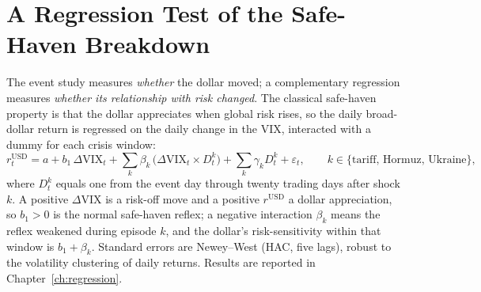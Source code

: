 \section{A Regression Test of the Safe-Haven Breakdown}
\label{sec:method_regression}

The event study measures \emph{whether} the dollar moved; a complementary regression
measures \emph{whether its relationship with risk changed}. The classical safe-haven
property is that the dollar appreciates when global risk rises, so the daily broad-dollar
return is regressed on the daily change in the VIX, interacted with a dummy for each crisis
window:
\begin{equation}
  r^{\text{USD}}_{t} = a + b_1\,\Delta\mathrm{VIX}_t
     + \sum_{k}\beta_k\,\bigl(\Delta\mathrm{VIX}_t \times D^{k}_t\bigr)
     + \sum_{k}\gamma_k D^{k}_t + \varepsilon_t,
  \qquad k\in\{\text{tariff},\,\text{Hormuz},\,\text{Ukraine}\},
\end{equation}
where $D^{k}_t$ equals one from the event day through twenty trading days after shock $k$. A
positive $\Delta\mathrm{VIX}$ is a risk-off move and a positive $r^{\text{USD}}$ a dollar
appreciation, so $b_1>0$ is the normal safe-haven reflex; a negative interaction $\beta_k$
means the reflex weakened during episode $k$, and the dollar's risk-sensitivity within that
window is $b_1+\beta_k$. Standard errors are Newey--West (HAC, five lags), robust to the
volatility clustering of daily returns. Results are reported in
Chapter~\ref{ch:regression}.
